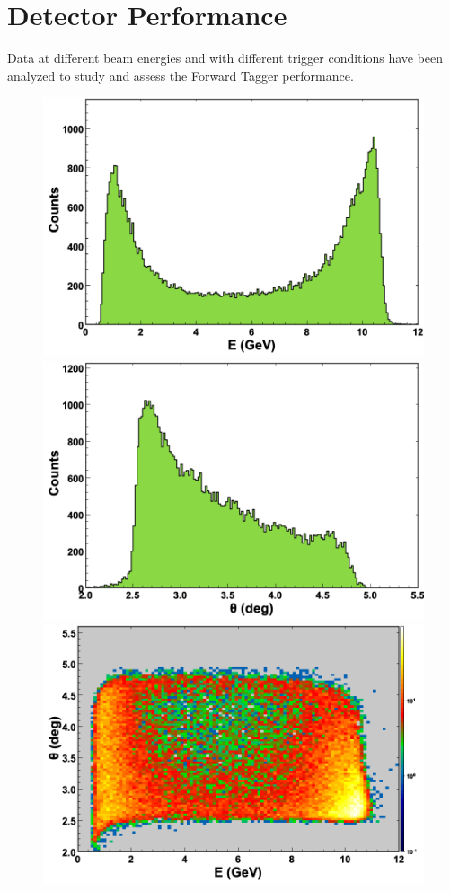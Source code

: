 \section{Detector Performance}

Data at different beam energies and with different trigger conditions have been analyzed to study and assess the
Forward Tagger performance. 

\begin{figure}[ht]
\begin{center}
\includegraphics[height=0.5\columnwidth]{fig/ft_acceptance_energy.png}
\includegraphics[height=0.5\columnwidth]{fig/ft_acceptance_theta.png}
\includegraphics[height=0.5\columnwidth]{fig/ft_acceptance_energytheta.png}

\end{center}
\end{figure}
